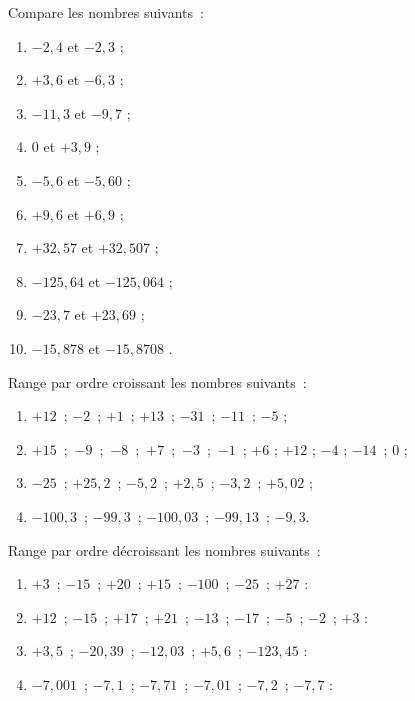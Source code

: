  
\begin{exercice}
Compare les nombres suivants :
\begin{enumerate}
 \item $- 2,4$ et $- 2,3$ \dotfill ;	
 \item $+ 3,6$ et $- 6,3$ \dotfill ;
 \item $- 11,3$ et $- 9,7$ \dotfill	; 	
 \item 0 et $+ 3,9$ \dotfill ; 	
 \item $- 5,6$ et $- 5,60$ \dotfill ;	 	
 \item $+ 9,6$ et $+ 6,9$ \dotfill	;	
 \item $+ 32,57$ et $+ 32,507$ \dotfill ;	 	
 \item $- 125,64$ et $- 125,064$ \dotfill ;	 	
 \item $- 23,7$ et $+ 23,69$ \dotfill ;	
 \item $- 15,878$ et $- 15,8708$ \dotfill.
  \end{enumerate}
\end{exercice}
 
 
\begin{exercice}[Rangements]
Range par ordre croissant les nombres suivants :
\begin{enumerate}
 \item $+ 12$ ; $- 2$ ; $+ 1$ ; $+ 13$ ; $- 31$ ; $- 11$ ; $- 5$ ;
 \item $+ 15$ ; $- 9$ ; $- 8$ ; $+ 7$ ; $- 3$ ; $- 1$ ; $+ 6$ ; $+ 12$ ; $- 4$ ; $- 14$ ; 0 ;
 \item $- 25$ ; $+ 25,2$ ; $- 5,2$ ; $+ 2,5$ ; $- 3,2$ ; $+ 5,02$ ;
 \item $- 100,3$ ; $- 99,3$ ; $- 100,03$ ; $- 99,13$ ; $- 9,3$.
 \end{enumerate}
\end{exercice}
        
    
\begin{exercice}
Range par ordre décroissant les nombres suivants :
\begin{enumerate}
 \item $+ 3$ ; $- 15$ ; $+ 20$ ; $+ 15$ ; $- 100$ ; $- 25$ ; $+ 27$ :

 \dotfill
 
 \dotfill	
	
 \item $+ 12$ ; $- 15$ ; $+ 17$ ; $+ 21$ ; $- 13$ ; $- 17$ ; $- 5$ ; $- 2$ ; $+ 3$ :
 
 \dotfill

 \dotfill	
	
 \item $+ 3,5$ ; $- 20,39$ ; $- 12,03$ ; $+ 5,6$ ; $- 123,45$ :

 \dotfill
 
 \dotfill	
	
 \item $- 7,001$ ; $- 7,1$ ; $- 7,71$ ; $- 7,01$ ; $- 7,2$ ; $- 7,7$ :
 
 \dotfill
  
 \dotfill
 \end{enumerate}	
\end{exercice}


